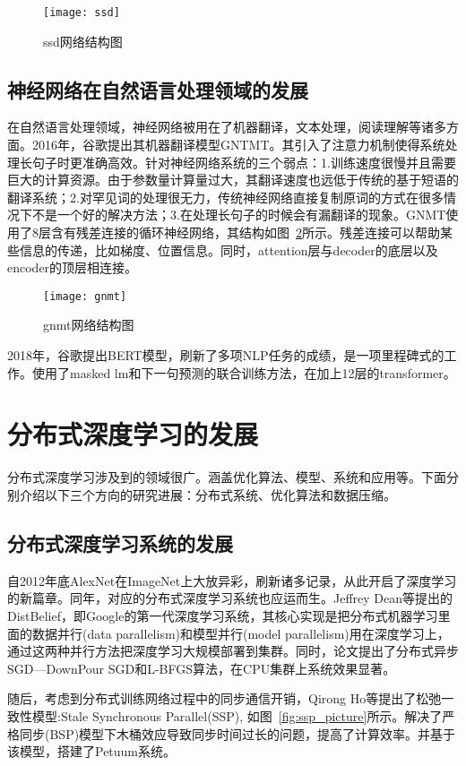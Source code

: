\begin{figure}[htp]
\centering
\texttt{[image: ssd]}
\caption{ssd网络结构图}
\label{fig:ssd}
\end{figure}
\subsection{神经网络在自然语言处理领域的发展}
在自然语言处理领域，神经网络被用在了机器翻译，文本处理，阅读理解等诸多方面。2016年，谷歌提出其机器翻译模型GNTMT。其引入了注意力机制使得系统处理长句子时更准确高效。针对神经网络系统的三个弱点：1.训练速度很慢并且需要巨大的计算资源。由于参数量计算量过大，其翻译速度也远低于传统的基于短语的翻译系统；2.对罕见词的处理很无力，传统神经网络直接复制原词的方式在很多情况下不是一个好的解决方法；3.在处理长句子的时候会有漏翻译的现象。GNMT使用了8层含有残差连接的循环神经网络，其结构如图~\ref{fig:gnmt}所示。残差连接可以帮助某些信息的传递，比如梯度、位置信息。同时，attention层与decoder的底层以及encoder的顶层相连接。

\begin{figure}[htp]
\centering
\texttt{[image: gnmt]}
\caption{gnmt网络结构图}
\label{fig:gnmt}
\end{figure}
2018年，谷歌提出BERT模型，刷新了多项NLP任务的成绩，是一项里程碑式的工作。使用了masked lm和下一句预测的联合训练方法，在加上12层的transformer。
\section{分布式深度学习的发展}
分布式深度学习涉及到的领域很广。涵盖优化算法、模型、系统和应用等。下面分别介绍以下三个方向的研究进展：分布式系统、优化算法和数据压缩。
\subsection{分布式深度学习系统的发展}
自2012年底AlexNet在ImageNet上大放异彩，刷新诸多记录，从此开启了深度学习的新篇章。同年，对应的分布式深度学习系统也应运而生。Jeffrey Dean等提出的DistBelief，即Google的第一代深度学习系统，其核心实现是把分布式机器学习里面的数据并行(data parallelism)和模型并行(model parallelism)用在深度学习上，通过这两种并行方法把深度学习大规模部署到集群。同时，论文提出了分布式异步SGD—DownPour SGD和L-BFGS算法，在CPU集群上系统效果显著。

随后，考虑到分布式训练网络过程中的同步通信开销，Qirong Ho等提出了松弛一致性模型:Stale Synchronous Parallel(SSP), 如图~\ref{fig:ssp_picture}所示。解决了严格同步(BSP)模型下木桶效应导致同步时间过长的问题，提高了计算效率。并基于该模型，搭建了Petuum系统。

